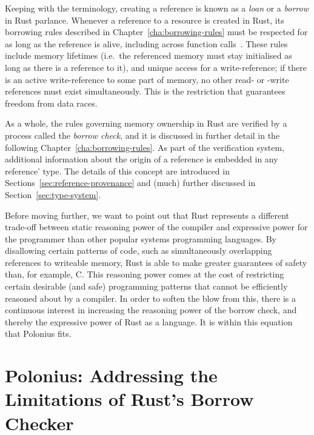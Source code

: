 \documentclass[11pt,a4paper,twoside,openany,draft]{report}
\begin{document}
Keeping with the terminology, creating a reference is known as a \textit{loan}
or a \textit{borrow} in Rust parlance. Whenever a reference to a resource is
created in Rust, its borrowing rules described in
Chapter~\ref{cha:borrowing-rules} must be respected for as long as the reference
is alive, including across function calls~\cite{nichols_rust_nodate}. These
rules include memory lifetimes (i.e.\ the referenced memory must stay initialised
as long as there is a reference to it), and unique access for a write-reference;
if there is an active write-reference to some part of memory, no other read- or
-write references must exist simultaneously. This is the restriction that
guarantees freedom from data races.

As a whole, the rules governing memory ownership in Rust are verified by a
process called the \textit{borrow check}, and it is discussed in further detail
in the following Chapter~\ref{cha:borrowing-rules}. As part of the verification
system, additional information about the origin of a reference is embedded in
any reference' type. The details of this concept are introduced in
Sections~\ref{sec:reference-provenance} and (much) further discussed in
Section~\ref{sec:type-system}.

Before moving further, we want to point out that Rust represents a different
trade-off between static reasoning power of the compiler and expressive power
for the programmer than other popular systems programming languages. By
disallowing certain patterns of code, such as simultaneously overlapping
references to writeable memory, Rust is able to make greater guarantees of
safety than, for example, C. This reasoning power comes at the cost of
restricting certain desirable (and safe) programming patterns that cannot be
efficiently reasoned about by a compiler. In order to soften the blow from this,
there is a continuous interest in increasing the reasoning power of the borrow
check, and thereby the expressive power of Rust as a language. It is within this
equation that Polonius fits.

\section{Polonius: Addressing the Limitations of Rust's Borrow
  Checker}\label{sec:limitations}
\end{document}
